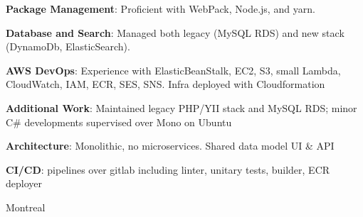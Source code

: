 \documentclass[
  a4paper,
   maincolor=cvblue,
   sectioncolor=cvblue,
   sidebarwidth=0.323\paperwidth,
]{fortysecondscv}
\begin{document}
\begin{cvtableNew}
{        \textbf{Package Management}: Proficient with WebPack, Node.js, and yarn.\vspace{5pt}

        \textbf{Database and Search}: Managed both legacy (MySQL RDS) and new stack (DynamoDb, ElasticSearch).\vspace{5pt}

        \textbf{AWS DevOps}: Experience with ElasticBeanStalk, EC2, S3, small Lambda, CloudWatch, IAM, ECR, SES, SNS. Infra deployed with Cloudformation\vspace{5pt}

        \textbf{Additional Work}: Maintained legacy PHP/YII stack and MySQL RDS; minor C\# developments supervised over Mono on Ubuntu\vspace{5pt}

        \textbf{Architecture}: Monolithic, no microservices. Shared data model UI \& API\vspace{5pt}

        \textbf{CI/CD}: pipelines over gitlab including linter, unitary tests, builder, ECR deployer
      }
    {Montreal} %
\end{cvtableNew}








\newpage
\makebacksidebar
\end{document}
